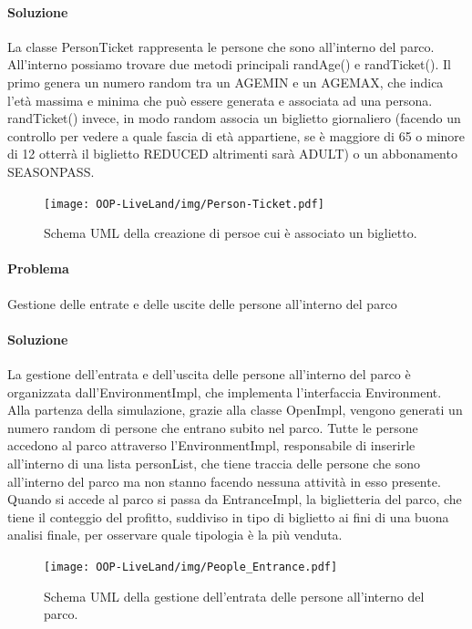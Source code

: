 \documentclass[a4paper,12pt]{report}
\begin{document}
\paragraph{Soluzione} La classe PersonTicket rappresenta le persone che sono all'interno del parco. All'interno possiamo trovare due metodi principali randAge() e randTicket().
Il primo genera un numero random tra un AGEMIN e un AGEMAX, che indica l'età massima e minima che può essere generata e associata ad una persona.
randTicket() invece, in modo random associa un biglietto giornaliero (facendo un controllo per vedere a quale fascia di età appartiene, se è maggiore di 65 o minore di 12 otterrà il biglietto REDUCED altrimenti sarà ADULT) o un abbonamento SEASONPASS.

\begin{figure}[h]
\centering{}
\texttt{[image: OOP-LiveLand/img/Person-Ticket.pdf]}
\caption{Schema UML della creazione di persoe cui è associato un biglietto.}
\label{img:Person-Ticket}
\end{figure}

\paragraph{Problema} Gestione delle entrate e delle uscite delle persone all'interno del parco
\paragraph{Soluzione} La gestione dell'entrata e dell'uscita delle persone all'interno del parco è organizzata dall'EnvironmentImpl, che implementa l'interfaccia Environment. Alla partenza della simulazione, grazie alla classe OpenImpl, vengono generati un numero  random di persone che entrano subito nel parco.
Tutte le persone accedono al parco attraverso l'EnvironmentImpl, responsabile di inserirle all'interno di una lista personList, che tiene traccia delle persone che sono all'interno del parco ma non stanno facendo nessuna attività in esso presente.
Quando si accede al parco si passa da EntranceImpl, la biglietteria del parco, che tiene il conteggio del profitto, suddiviso in tipo di biglietto ai fini di una buona analisi finale, per osservare quale tipologia è la più venduta.

\begin{figure}[h]
\centering{}
\texttt{[image: OOP-LiveLand/img/People\_Entrance.pdf]}
\caption{Schema UML della gestione dell'entrata delle persone all'interno del parco.}
\label{img:People_Entrance}
\end{figure}
\end{document}
